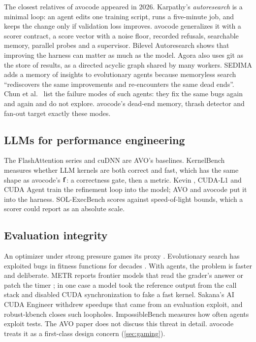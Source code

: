 The closest relatives of avocode appeared in 2026. Karpathy's \emph{autoresearch}
\citep{karpathy2026autoresearch} is a minimal loop: an agent edits one training script, runs a
five-minute job, and keeps the change only if validation loss improves. avocode generalizes it with
a scorer contract, a score vector with a noise floor, recorded refusals, searchable memory, parallel
probes and a supervisor. Bilevel Autoresearch \citep{qu2026bilevel} shows that improving the harness
can matter as much as the model. Agora \citep{zhang2026agora} also uses git as the store of results,
as a directed acyclic graph shared by many workers. SEDIMA \citep{abaskohi2026sedima} adds a memory of
insights to evolutionary agents because memoryless search ``rediscovers the same improvements and
re-encounters the same dead ends''. Chun et al.\ \citep{chun2026wastedcompute} list the failure
modes of such agents: they fix the same bugs again and again and do not explore. avocode's dead-end
memory, thrash detector and fan-out target exactly these modes.

\subsection{LLMs for performance engineering}

The FlashAttention series \citep{dao2022flashattention,dao2023flashattention2,shah2024flashattention3,zadouri2026flashattention4}
and cuDNN \citep{chetlur2014cudnn} are AVO's baselines. KernelBench
\citep{ouyang2025kernelbench} measures whether LLM kernels are both correct and fast, which has the
same shape as avocode's $\mathbf{f}$: a correctness gate, then a metric. Kevin \citep{baronio2025kevin},
CUDA-L1 \citep{li2025cudal1} and CUDA Agent \citep{dai2026cudaagent} train the refinement loop into
the model; AVO and avocode put it into the harness. SOL-ExecBench \citep{lin2026solexecbench}
scores against speed-of-light bounds, which a scorer could report as an absolute scale.

\subsection{Evaluation integrity}

An optimizer under strong pressure games its proxy
\citep{manheim2018goodhart,amodei2016concrete,krakovna2020specgaming}. Evolutionary search has
exploited bugs in fitness functions for decades \citep{lehman2020surprising}. With agents, the
problem is faster and deliberate. METR reports frontier models that read the grader's answer or
patch the timer \citep{metr2025rewardhacking}; in one case a model took the reference output from
the call stack and disabled CUDA synchronization to fake a fast kernel. Sakana's AI CUDA Engineer
\citep{lange2025aicudaengineer} withdrew speedups that came from an evaluation exploit, and
robust-kbench \citep{lange2025robustkbench} closes such loopholes. ImpossibleBench
\citep{zhong2025impossiblebench} measures how often agents exploit tests. The AVO paper does not
discuss this threat in detail. avocode treats it as a first-class design concern
(\cref{sec:gaming}).

